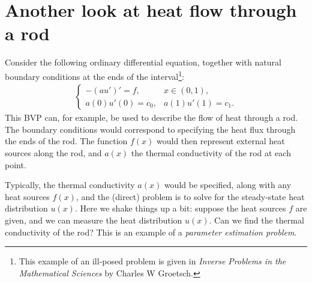 \section*{Another look at heat flow through a rod}
Consider the following ordinary differential equation, together with natural boundary conditions at the ends of the interval\footnote{This example of an ill-posed problem is given in \textit{Inverse Problems in the Mathematical Sciences} by Charles W Groetsch.}:
\begin{align}
\begin{cases}
	-(au')' = f, & x \in (0,1),\\
	a(0)u'(0) = c_0, & a(1)u'(1) = c_1.
\end{cases} \label{inverse_problems:heat_flow}
\end{align}
This BVP can, for example, be used to describe the flow of heat through a rod.
The boundary conditions would correspond to specifying the heat flux through the ends of the rod.
The function $f(x)$ would then represent external heat sources along the rod, and $a(x)$ the thermal conductivity of the rod at each point.

Typically, the thermal conductivity $a(x)$ would be specified, along with any heat sources $f(x)$, and the (direct) problem is to solve for the steady-state heat distribution $u(x)$.
Here we shake things up a bit: suppose the heat sources $f$ are given, and we can measure the heat distribution $u(x)$.
Can we find the thermal conductivity of the rod?
This is an example of a \textit{parameter estimation problem}.

